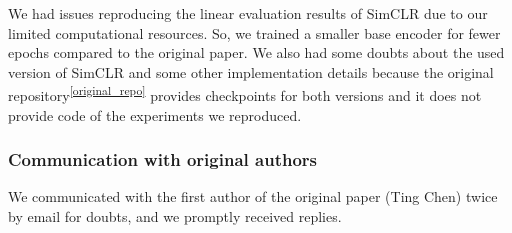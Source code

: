 We had issues reproducing the linear evaluation results of SimCLR due to our limited computational resources. So, we trained a smaller base encoder for fewer epochs compared to the original paper. We also had some doubts about the used version of SimCLR and some other implementation details because the original repository\textsuperscript{\ref{original_repo}} provides checkpoints for both versions and it does not provide code of the experiments we reproduced.


\subsubsection*{Communication with original authors}
We communicated with the first author of the original paper (Ting Chen) twice by email for doubts, and we promptly received replies.
